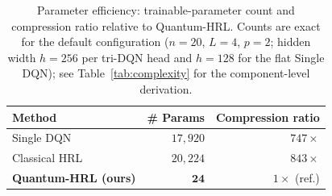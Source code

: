 \documentclass[11pt,a4paper]{article}
\theoremstyle{definition}
\begin{document}
\begin{table}[t]
\centering
\caption{Parameter efficiency: trainable-parameter count and compression ratio relative to Quantum-HRL. Counts are exact for the default configuration ($n{=}20$, $L{=}4$, $p{=}2$; hidden width $h{=}256$ per tri-DQN head and $h{=}128$ for the flat Single DQN); see Table~\ref{tab:complexity} for the component-level derivation.}
\label{tab:param_eff}
\begin{tabular}{@{}lrr@{}}
\toprule
\textbf{Method} & \textbf{\# Params} & \textbf{Compression ratio} \\
\midrule
Single DQN                   & $17{,}920$ & $747\times$ \\
Classical HRL~\cite{hrl_ntn}  & $20{,}224$ & $843\times$ \\
\textbf{Quantum-HRL (ours)}   & $\mathbf{24}$ & $1\times$ (ref.) \\
\bottomrule
\end{tabular}
\end{table}
\end{document}
